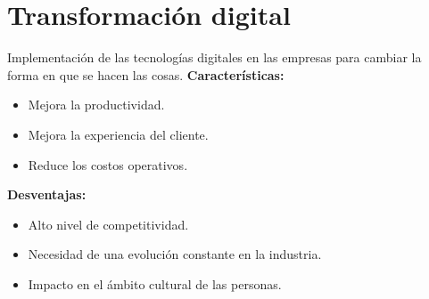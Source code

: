 \documentclass{templateNote}
\begin{document}
\section{Transformación digital}
Implementación de las tecnologías digitales en las empresas para cambiar la forma en que se hacen las cosas.\newline
\textbf{Características:}
\begin{itemize}
    \item Mejora la productividad.
    \item Mejora la experiencia del cliente.
    \item Reduce los costos operativos.
\end{itemize}
\textbf{Desventajas:}
\begin{itemize}
    \item Alto nivel de competitividad.
    \item Necesidad de una evolución constante en la industria.
    \item Impacto en el ámbito cultural de las personas.
\end{itemize}
\end{document}
